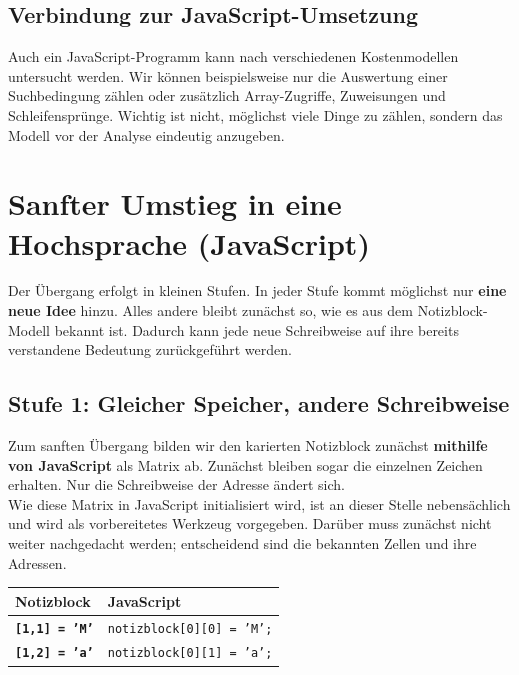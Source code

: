 \documentclass{article}
\begin{document}
\subsection{Verbindung zur JavaScript-Umsetzung}

Auch ein JavaScript-Programm kann nach verschiedenen Kostenmodellen untersucht werden. Wir können beispielsweise nur die Auswertung einer Suchbedingung zählen oder zusätzlich Array-Zugriffe, Zuweisungen und Schleifensprünge. Wichtig ist nicht, möglichst viele Dinge zu zählen, sondern das Modell vor der Analyse eindeutig anzugeben.


\newpage
\section{Sanfter Umstieg in eine Hochsprache (JavaScript)}

Der Übergang erfolgt in kleinen Stufen. In jeder Stufe kommt möglichst nur \textbf{eine neue Idee} hinzu. Alles andere bleibt zunächst so, wie es aus dem Notizblock-Modell bekannt ist. Dadurch kann jede neue Schreibweise auf ihre bereits verstandene Bedeutung zurückgeführt werden.

\subsection{Stufe 1: Gleicher Speicher, andere Schreibweise}

Zum sanften Übergang bilden wir den karierten Notizblock zunächst \textbf{mithilfe von JavaScript} als Matrix ab. Zunächst bleiben sogar die einzelnen Zeichen erhalten. Nur die Schreibweise der Adresse ändert sich.\\
Wie diese Matrix in JavaScript initialisiert wird, ist an dieser Stelle nebensächlich und wird als vorbereitetes Werkzeug vorgegeben. Darüber muss zunächst nicht weiter nachgedacht werden; entscheidend sind die bekannten Zellen und ihre Adressen.

\begin{center}
\begin{tabularx}{0.8\textwidth}{|>{\bfseries}l|X|}
\hline
Notizblock & JavaScript \\
\hline
\texttt{[1,1] = 'M'} & \texttt{notizblock[0][0] = 'M';} \\
\texttt{[1,2] = 'a'} & \texttt{notizblock[0][1] = 'a';} \\
\hline
\end{tabularx}
\end{center}
\end{document}

